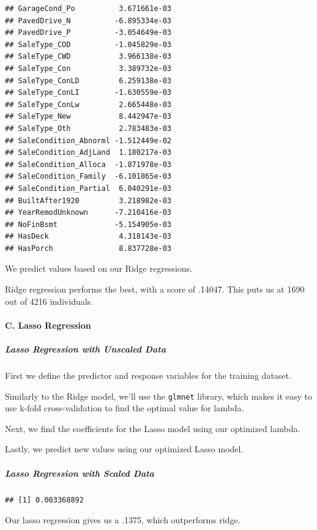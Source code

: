 \documentclass[
]{article}
\begin{document}
\begin{verbatim}
## GarageCond_Po          3.671661e-03
## PavedDrive_N          -6.895334e-03
## PavedDrive_P          -3.054649e-03
## SaleType_COD          -1.045829e-03
## SaleType_CWD           3.966138e-03
## SaleType_Con           3.389732e-03
## SaleType_ConLD         6.259138e-03
## SaleType_ConLI        -1.630559e-03
## SaleType_ConLw         2.665448e-03
## SaleType_New           8.442947e-03
## SaleType_Oth           2.783483e-03
## SaleCondition_Abnorml -1.512449e-02
## SaleCondition_AdjLand  1.180217e-03
## SaleCondition_Alloca  -1.871978e-03
## SaleCondition_Family  -6.101865e-03
## SaleCondition_Partial  6.040291e-03
## BuiltAfter1920         3.218982e-03
## YearRemodUnknown      -7.210416e-03
## NoFinBsmt             -5.154905e-03
## HasDeck                4.318143e-03
## HasPorch               8.837728e-03
\end{verbatim}

We predict values based on our Ridge regressions.

Ridge regression performs the best, with a score of .14047. This puts us
at 1690 out of 4216 individuals.

\hypertarget{c.-lasso-regression}{%
\paragraph{C. Lasso Regression}\label{c.-lasso-regression}}

\hypertarget{lasso-regression-with-unscaled-data}{%
\subparagraph{Lasso Regression with Unscaled
Data}\label{lasso-regression-with-unscaled-data}}

First we define the predictor and response variables for the training
dataset.

Similarly to the Ridge model, we'll use the \texttt{glmnet} library,
which makes it easy to use k-fold cross-validation to find the optimal
value for lambda.

Next, we find the coefficients for the Lasso model using our optimized
lambda.

Lastly, we predict new values using our optimized Lasso model.

\hypertarget{lasso-regression-with-scaled-data}{%
\subparagraph{Lasso Regression with Scaled
Data}\label{lasso-regression-with-scaled-data}}

\begin{verbatim}
## [1] 0.003368892
\end{verbatim}

Our lasso regression gives us a .1375, which outperforms ridge.
\end{document}
